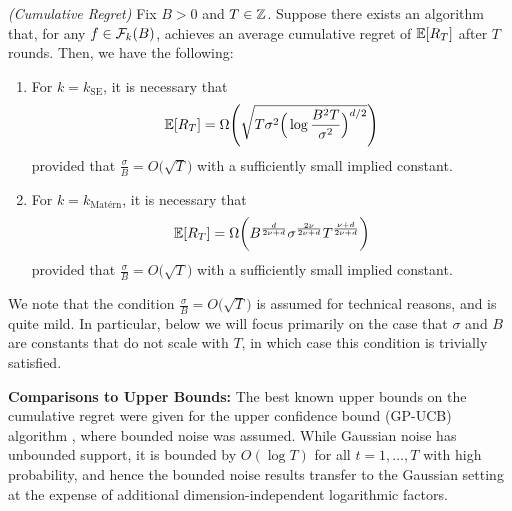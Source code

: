 \documentclass[english,onecolumn,final,11pt]{IEEEtran} %
\newcommand{\kSE}{k_{\text{SE}}}
\newcommand{\kMat}{k_{\text{Mat\'ern}}}
\begin{document}
\begin{theorem} \label{thm:cumulative}
    \emph{(Cumulative Regret)}
    Fix $B > 0$ and $T \in \mathbb{Z}$.   Suppose there exists an algorithm that, for any $f \in \mathcal{F}_k(B)$, achieves an average cumulative regret of $\mathbb{E}[R_T]$ after $T$ rounds.  Then, we have the following:
    \begin{enumerate}
        \item For $k = \kSE$, it is necessary that
        \begin{equation}
            \mathbb{E}[R_T] = \Omega\Bigg( \sqrt{T\sigma^2 \Big(\log \frac{B^2 T}{\sigma^2} \Big)^{d/2} } \Bigg) \label{eq:cumul_SE}
       \end{equation}
       provided that $\frac{\sigma}{B} = O\big(\sqrt{T}\big)$ with a sufficiently small implied constant.
        \item For $k = \kMat$, it is necessary that
        \begin{equation}
            \mathbb{E}[R_T] = \Omega\bigg( B^{\frac{d}{2\nu + d}} \sigma^{\frac{2\nu}{2\nu + d}} T^{\frac{\nu + d}{2\nu + d}} \bigg) \label{eq:cumul_Mat}
       \end{equation}
       provided that $\frac{\sigma}{B} = O\big(\sqrt{T}\big)$ with a sufficiently small implied constant.
    \end{enumerate}
\end{theorem}

We note that the condition $\frac{\sigma}{B} = O\big(\sqrt{T}\big)$ is assumed for technical reasons, and is quite mild.  In particular, below we will focus primarily on the case that $\sigma$ and $B$ are constants that do not scale with $T$, in which case this condition is trivially satisfied.

\textbf{Comparisons to Upper Bounds:}
The best known upper bounds on the cumulative regret were given for the upper confidence bound (GP-UCB) algorithm \cite{Sri09}, where bounded noise was assumed.  While Gaussian noise has unbounded support, it is bounded by $O(\log T)$ for all $t=1,\dotsc,T$ with high probability, and hence the bounded noise results transfer to the Gaussian setting at the expense of additional dimension-independent logarithmic factors.  
\end{document}
